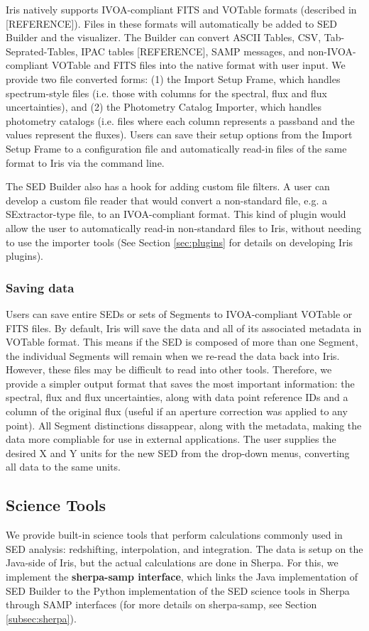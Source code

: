 Iris natively supports IVOA-compliant FITS and VOTable formats (described in [REFERENCE]). Files in these formats will automatically be added to SED Builder and the visualizer. The Builder can convert ASCII Tables, CSV, Tab-Seprated-Tables, IPAC tables [REFERENCE], SAMP messages, and non-IVOA-compliant VOTable and FITS files into the native format with user input. We provide two file converted forms: (1) the Import Setup Frame, which handles spectrum-style files (i.e. those with columns for the spectral, flux and flux uncertainties), and (2) the Photometry Catalog Importer, which handles photometry catalogs (i.e. files where each column represents a passband and the values represent the fluxes). Users can save their setup options from the Import Setup Frame to a configuration file and automatically read-in files of the same format to Iris via the command line.

The SED Builder also has a hook for adding custom file filters. A user can develop a custom file reader that would convert a non-standard file, e.g. a SExtractor-type file, to an IVOA-compliant format. This kind of plugin would allow the user to automatically read-in non-standard files to Iris, without needing to use the importer tools (See Section \ref{sec:plugins} for details on developing Iris plugins).

\subsubsection{Saving data}
Users can save entire SEDs or sets of Segments to IVOA-compliant VOTable or FITS files. By default, Iris will save the data and all of its associated metadata in VOTable format. This means if the SED is composed of more than one Segment, the individual Segments will remain when we re-read the data back into Iris. However, these files may be difficult to read into other tools. Therefore, we provide a simpler output format that saves the most important information: the spectral, flux and flux uncertainties, along with data point reference IDs and a column of the original flux (useful if an aperture correction was applied to any point). All Segment distinctions dissappear, along with the metadata, making the data more compliable for use in external applications. The user supplies the desired X and Y units for the new SED from the drop-down menus, converting all data to the same units.

\subsection{Science Tools}
We provide built-in science tools that perform calculations commonly used in SED analysis: redshifting, interpolation, and integration. The data is setup on the Java-side of Iris, but the actual calculations are done in Sherpa. For this, we implement the \textbf{sherpa-samp interface}, which links the Java implementation of SED Builder to the Python implementation of the SED science tools in Sherpa through SAMP interfaces (for more details on sherpa-samp, see Section \ref{subsec:sherpa}).

